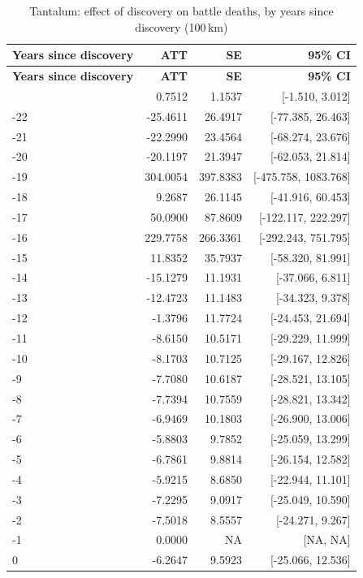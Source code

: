 \begin{longtable}{lrrr}
\caption{Tantalum: effect of discovery on battle deaths, by years since discovery (100\,km)} \label{tab:tantalum_battle_deaths_best_} \\
\toprule
\textbf{Years since discovery} & \textbf{ATT} & \textbf{SE} & \textbf{95\% CI} \\
\midrule \endfirsthead
\toprule
\textbf{Years since discovery} & \textbf{ATT} & \textbf{SE} & \textbf{95\% CI} \\
\midrule \endhead
\bottomrule \endlastfoot
-23 & 0.7512 & 1.1537 & [-1.510, 3.012] \\
-22 & -25.4611 & 26.4917 & [-77.385, 26.463] \\
-21 & -22.2990 & 23.4564 & [-68.274, 23.676] \\
-20 & -20.1197 & 21.3947 & [-62.053, 21.814] \\
-19 & 304.0054 & 397.8383 & [-475.758, 1083.768] \\
-18 & 9.2687 & 26.1145 & [-41.916, 60.453] \\
-17 & 50.0900 & 87.8609 & [-122.117, 222.297] \\
-16 & 229.7758 & 266.3361 & [-292.243, 751.795] \\
-15 & 11.8352 & 35.7937 & [-58.320, 81.991] \\
-14 & -15.1279 & 11.1931 & [-37.066, 6.811] \\
-13 & -12.4723 & 11.1483 & [-34.323, 9.378] \\
-12 & -1.3796 & 11.7724 & [-24.453, 21.694] \\
-11 & -8.6150 & 10.5171 & [-29.229, 11.999] \\
-10 & -8.1703 & 10.7125 & [-29.167, 12.826] \\
-9 & -7.7080 & 10.6187 & [-28.521, 13.105] \\
-8 & -7.7394 & 10.7559 & [-28.821, 13.342] \\
-7 & -6.9469 & 10.1803 & [-26.900, 13.006] \\
-6 & -5.8803 & 9.7852 & [-25.059, 13.299] \\
-5 & -6.7861 & 9.8814 & [-26.154, 12.582] \\
-4 & -5.9215 & 8.6850 & [-22.944, 11.101] \\
-3 & -7.2295 & 9.0917 & [-25.049, 10.590] \\
-2 & -7.5018 & 8.5557 & [-24.271, 9.267] \\
-1 & 0.0000 & NA & [NA, NA] \\
0 & -6.2647 & 9.5923 & [-25.066, 12.536] \\

\end{longtable}
